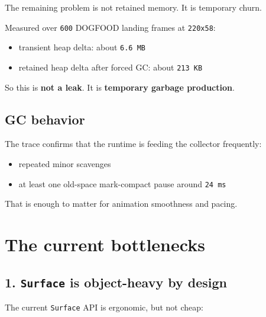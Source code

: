 The remaining problem is not retained memory. It is temporary churn.

Measured over \texttt{6\allowbreak{}0\allowbreak{}0} DOGFOOD landing frames at \texttt{2\allowbreak{}2\allowbreak{}0\allowbreak{}x\allowbreak{}5\allowbreak{}8}:

\begin{itemize}
\tightlist
\item
  transient heap delta: about \texttt{6\allowbreak{}.\allowbreak{}6\allowbreak{} \allowbreak{}M\allowbreak{}B}
\item
  retained heap delta after forced GC: about \texttt{2\allowbreak{}1\allowbreak{}3\allowbreak{} \allowbreak{}K\allowbreak{}B}
\end{itemize}

So this is \textbf{not a leak}. It is \textbf{temporary garbage production}.

\subsection{GC behavior}\label{record-052-gc-behavior}

The trace confirms that the runtime is feeding the collector frequently:

\begin{itemize}
\tightlist
\item
  repeated minor scavenges
\item
  at least one old-space mark-compact pause around \texttt{2\allowbreak{}4\allowbreak{} \allowbreak{}m\allowbreak{}s}
\end{itemize}

That is enough to matter for animation smoothness and pacing.

\section{The current bottlenecks}\label{record-052-the-current-bottlenecks}

\subsection{\texorpdfstring{1. \texttt{S\allowbreak{}u\allowbreak{}r\allowbreak{}f\allowbreak{}a\allowbreak{}c\allowbreak{}e} is object-heavy by design}{1.  is object-heavy by design}}\label{record-052-surface-is-object-heavy-by-design}

The current \texttt{S\allowbreak{}u\allowbreak{}r\allowbreak{}f\allowbreak{}a\allowbreak{}c\allowbreak{}e} API is ergonomic, but not cheap:

